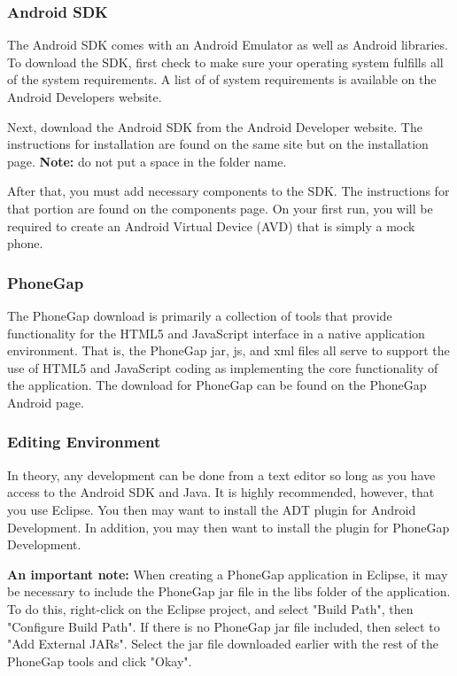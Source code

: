\documentclass[12pt]{article}
\begin{document}
\subsubsection{Android SDK}
The Android SDK comes with an Android Emulator as well as Android libraries.
To download the SDK, first check to make sure your operating system fulfills all of the system requirements.  A list of of system requirements is available on the Android Developers website\cite{AndroidSDK-SystemRequirements}.

Next, download the Android SDK from the Android Developer website\cite{AndroidSDK-Download}.
The instructions for installation are found on the same site but on the installation page\cite{AndroidSDK-Installation}. \textbf{Note:} do not put a space in the folder name.

After that, you must add necessary components to the SDK.  The instructions for that portion are found on the components page\cite{AndroidSDK-Components}.  On your first run, you will be required to create an Android Virtual Device (AVD) that is simply a mock phone.


\subsubsection{PhoneGap}
The PhoneGap download is primarily a collection of tools that provide functionality for the HTML5 and JavaScript interface in a native application environment.  That is, the PhoneGap jar, js, and xml files all serve to support the use of HTML5 and JavaScript coding as implementing the core functionality of the application.  The download for PhoneGap can be found on the PhoneGap Android page\cite{PhoneGap-Android}.


\subsubsection{Editing Environment}
In theory, any development can be done from a text editor so long as you have access to the Android SDK and Java.  It is highly recommended, however, that you use Eclipse\cite{Eclipse-Helios}.  You then may want to install the ADT plugin for Android Development\cite{Eclipse-ADT}.  In addition, you may then want to install the plugin for PhoneGap Development\cite{PhoneGap-Eclipse}.

\textbf{An important note:} When creating a PhoneGap application in Eclipse, it may be necessary to include the PhoneGap jar file in the libs folder of the application.  To do this, right-click on the Eclipse project, and select "Build Path", then "Configure Build Path".  If there is no PhoneGap jar file included, then select to "Add External JARs".  Select the jar file downloaded earlier with the rest of the PhoneGap tools and click "Okay".
\end{document}
